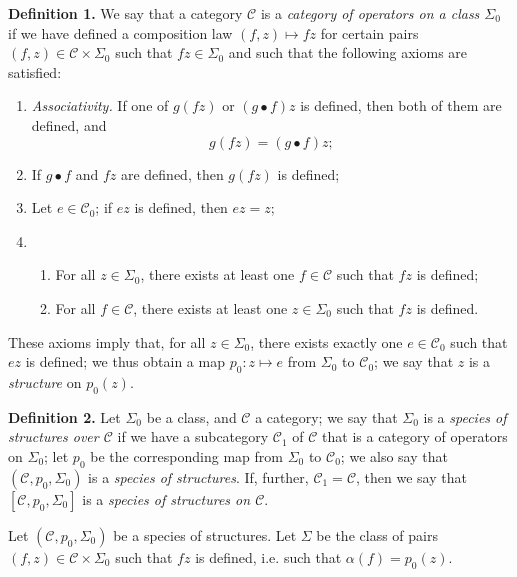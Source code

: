 \documentclass[a4paper,oneside,nobib,nofonts,notitlepage,notoc,nols,fleqn,justified]{tufte-book}
\newenvironment{rmenv}[1]
  {\phantomsection\par\medskip\noindent\textbf{#1.}\rmfamily}
  {\par\medskip}
\newcommand{\CC}{\mathcal{C}}
\begin{document}
\begin{rmenv}{Definition 1}
\label{definition:i-1}
  We say that a category $\CC$ is a \emph{category of operators on a class $\Sigma_0$} if we have defined a composition law $(f,z)\mapsto fz$ for certain pairs $(f,z)\in\CC\times\Sigma_0$ such that $fz\in\Sigma_0$ and such that the following axioms are satisfied:
  \begin{enumerate}
    \item[\normalfont(1)]
      \emph{Associativity.}
      If one of $g(fz)$ or $(g\bullet f)z$ is defined, then both of them are defined, and
      \[
        g(fz)
        = (g\bullet f)z;
      \]
    \item[\normalfont(2)]
      If $g\bullet f$ and $fz$ are defined, then $g(fz)$ is defined;
    \item[\normalfont(3)]
      Let $e\in\CC_0$;
      if $ez$ is defined, then $ez=z$;
    \item[\normalfont(4)]
      \begin{enumerate}
        \item[(a)]
          For all $z\in\Sigma_0$, there exists at least one $f\in\CC$ such that $fz$ is defined;
        \item[(b)]
          For all $f\in\CC$, there exists at least one $z\in\Sigma_0$ such that $fz$ is defined.
      \end{enumerate}
  \end{enumerate}
\end{rmenv}

These axioms imply that, for all $z\in\Sigma_0$, there exists exactly one $e\in\CC_0$ such that $ez$ is defined;
we thus obtain a map $p_0\colon z\mapsto e$ from $\Sigma_0$ to $\CC_0$;
we say that $z$ is a \emph{structure} on $p_0(z)$.

\begin{rmenv}{Definition 2}
\label{definition:i-2}
  Let $\Sigma_0$ be a class, and $\CC$ a category;
  we say that $\Sigma_0$ is a \emph{species of structures over $\CC$} if we have a subcategory $\CC_1$ of $\CC$ that is a category of operators on $\Sigma_0$;
  let $p_0$ be the corresponding map from $\Sigma_0$ to $\CC_0$;
  we also say that $(\CC,p_0,\Sigma_0)$ is a \emph{species of structures}.
  If, further, $\CC_1=\CC$, then we say that $[\CC,p_0,\Sigma_0]$ is a \emph{species of structures on $\CC$}.
\end{rmenv}

Let $(\CC,p_0,\Sigma_0)$ be a species of structures.
Let $\Sigma$ be the class of pairs $(f,z)\in\CC\times\Sigma_0$ such that $fz$ is defined, i.e. such that $\alpha(f)=p_0(z)$.
\end{document}
